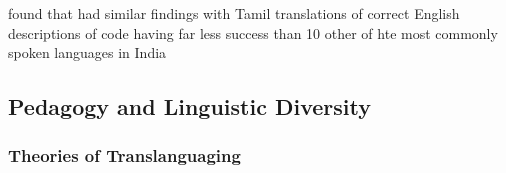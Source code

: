\citet{} found that 
\citet{smith2024explain} had similar findings with Tamil translations of
correct English descriptions of code having far less success than 10 other of
hte most commonly spoken languages in India



\subsection{Pedagogy and Linguistic Diversity}

\subsubsection{Theories of Translanguaging}







